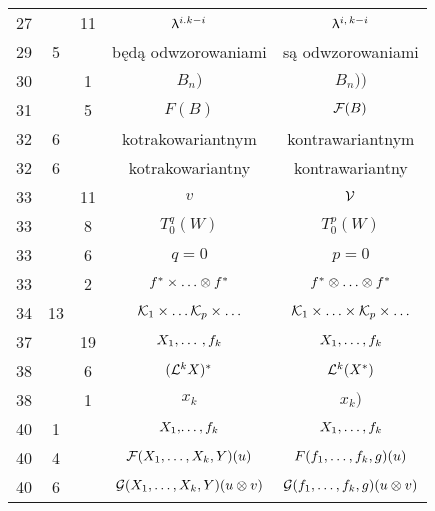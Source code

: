 \documentclass[a4paper,11pt]{article}
\begin{document}
\begin{center}
\begin{tabular}{|c|c|c|c|c|}
    27  & & 11 & $\uplambda^{ i. k - i }$ & $\uplambda^{ i,\, k - i }$ \\
    29  &  5 & & będą odwzorowaniami & są odwzorowaniami \\
    30  & &  1 & $B_{ n } )$ & $B_{ n } ) )$ \\
    31  & &  5 & $F( B )$ & $\mathcal{F}( B )$ \\
    32  &  6 & & kotrakowariantnym & kontrawariantnym \\
    32  &  6 & & kotrakowariantny & kontrawariantny \\
    33  & & 11 & $v$ & $\mathcal{V}$ \\
    33  & &  8 & $T_{ 0 }^{ q }( W )$ & $T_{ 0 }^{ p }( W )$ \\
    33  & &  6 & $q = 0$ & $p = 0$ \\
    33  & &  2 & $f^{ * } \times \ldots \otimes f^{ * }$
           & $f^{ * } \otimes \ldots \otimes f^{ * }$ \\
    34  & 13 & & $\mathcal{K}_{ 1 } \times \ldots \mathcal{K}_{ p } \times \ldots$
           & $\mathcal{K}_{ 1 } \times \ldots \times \mathcal{K}_{ p } \times \ldots$ \\
    37  & & 19 & $X_{ 1 }, \ldots\, , f_{ k }$ & $X_{ 1 }, \ldots , f_{ k }$ \\
    38  & &  6 & $( \mathcal{L}^{ k } X )^{ * }$ & $\mathcal{L}^{ k }( X^{ * } )$ \\
    38  & &  1 & $x_{ k }$ & $x_{ k } )$ \\
    40  &  1 & & $X_{ 1 }, \! \ldots , f_{ k }$ & $X_{ 1 }, \ldots , f_{ k }$ \\
    40  &  4 & & $\mathcal{F}( X_{ 1 }, \ldots, X_{ k }, Y )( u )$
           & $F( f_{ 1 }, \ldots, f_{ k }, g )( u )$ \\
    40  &  6 & & $\mathcal{G}( X_{ 1 }, \ldots, X_{ k }, Y )( u \otimes v )$
           & $\mathcal{G}( f_{ 1 }, \ldots, f_{ k }, g )( u \otimes v )$ \\
    \hline
  \end{tabular}


\end{center}
\end{document}
